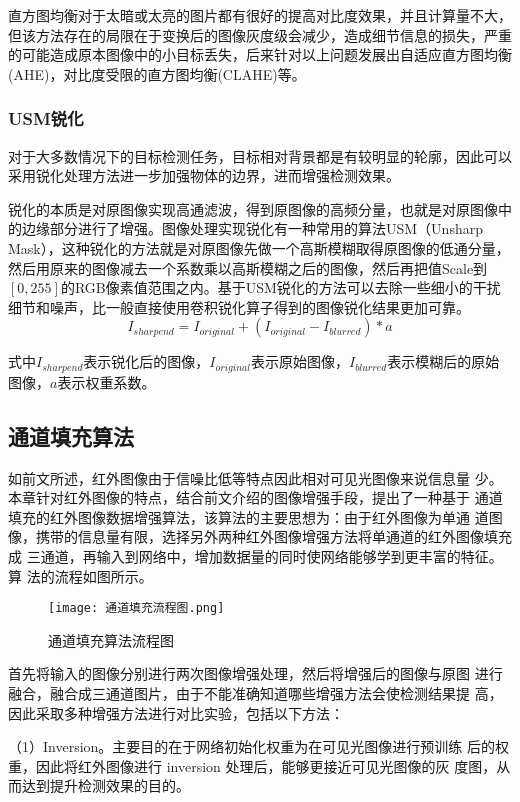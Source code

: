 直方图均衡对于太暗或太亮的图片都有很好的提高对比度效果，并且计算量不大，但该方法存在的局限在于变换后的图像灰度级会减少，造成细节信息的损失，严重的可能造成原本图像中的小目标丢失，后来针对以上问题发展出自适应直方图均衡(AHE)，对比度受限的直方图均衡(CLAHE)等。

\subsubsection{USM锐化}
对于大多数情况下的目标检测任务，目标相对背景都是有较明显的轮廓，因此可以采用锐化处理方法进一步加强物体的边界，进而增强检测效果。

锐化的本质是对原图像实现高通滤波，得到原图像的高频分量，也就是对原图像中的边缘部分进行了增强。图像处理实现锐化有一种常用的算法USM（Unsharp Mask），这种锐化的方法就是对原图像先做一个高斯模糊取得原图像的低通分量，然后用原来的图像减去一个系数乘以高斯模糊之后的图像，然后再把值Scale到$[0,255]$的RGB像素值范围之内。基于USM锐化的方法可以去除一些细小的干扰细节和噪声，比一般直接使用卷积锐化算子得到的图像锐化结果更加可靠。
\begin{equation}
  I_{sharpend}=I_{original}+(I_{original}-I_{blurred})*a
\end{equation}

式中$I_{sharpend}$表示锐化后的图像，$I_{original}$表示原始图像，$I_{blurred}$表示模糊后的原始图像，$a$表示权重系数。

\subsection{通道填充算法}
如前文所述，红外图像由于信噪比低等特点因此相对可见光图像来说信息量
少。本章针对红外图像的特点，结合前文介绍的图像增强手段，提出了一种基于
通道填充的红外图像数据增强算法，该算法的主要思想为：由于红外图像为单通
道图像，携带的信息量有限，选择另外两种红外图像增强方法将单通道的红外图像填充成
三通道，再输入到网络中，增加数据量的同时使网络能够学到更丰富的特征。算
法的流程如图所示。

\begin{figure}[h]
  \centering
  \texttt{[image: 通道填充流程图.png]}
  \caption{通道填充算法流程图}
  \label{tdtc}
\end{figure}

首先将输入的图像分别进行两次图像增强处理，然后将增强后的图像与原图
进行融合，融合成三通道图片，由于不能准确知道哪些增强方法会使检测结果提
高，因此采取多种增强方法进行对比实验，包括以下方法：

（1）Inversion。主要目的在于网络初始化权重为在可见光图像进行预训练
后的权重，因此将红外图像进行 inversion 处理后，能够更接近可见光图像的灰
度图，从而达到提升检测效果的目的。

